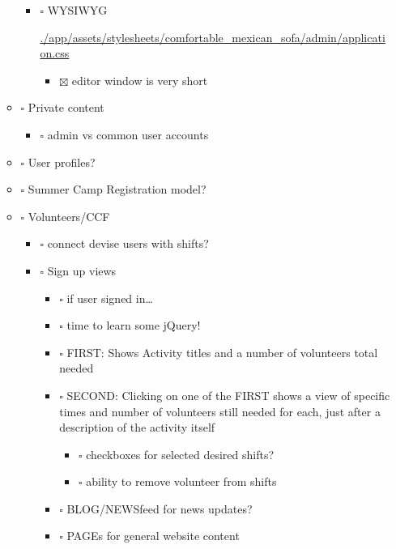 \documentclass[11pt]{article}
\begin{document}
\begin{itemize}
\begin{itemize}
\begin{itemize}
\item $\square$ WYSIWYG

\url{./app/assets/stylesheets/comfortable_mexican_sofa/admin/application.css}

\begin{itemize}
\item $\boxtimes$ editor window is very short
\end{itemize}
\end{itemize}

\item $\square$ Private content

\begin{itemize}
\item $\square$ admin vs common user accounts
\end{itemize}

\item $\square$ User profiles?

\item $\square$ Summer Camp Registration model?

\item $\square$ Volunteers/CCF

\begin{itemize}
\item $\square$ connect devise users with shifts?

\item $\square$ Sign up views

\begin{itemize}
\item $\square$ if user signed in\ldots{}

\item $\square$ time to learn some jQuery!

\item $\square$ FIRST: Shows Activity titles and a number of volunteers total needed

\item $\square$ SECOND: Clicking on one of the FIRST shows a view of specific times
and number of volunteers still needed for each, just after a description
of the activity itself

\begin{itemize}
\item $\square$ checkboxes for selected desired shifts?

\item $\square$ ability to remove volunteer from shifts
\end{itemize}

\item $\square$ BLOG/NEWSfeed for news updates?

\item $\square$ PAGEs for general website content
\end{itemize}
\end{itemize}
\end{itemize}
\end{itemize}
\end{document}
